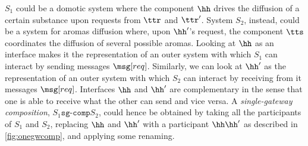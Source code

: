 \noindent
$S_1$ could be a domotic system where the component $\hh$ drives the diffusion of a certain substance
upon requests from $\ttr$ and $\ttr'$.
System $S_2$, instead, could be a system for aromas diffusion where, upon $\hh'$'s request, 
the component $\tts$ coordinates the diffusion of several possible aromas.  
 Looking at $\hh$ as an interface makes it the representation of an outer system with which
 $S_1$ can interact by sending messages $\msg[req]$. Similarly, we can look at $\hh'$ as the
 representation of an outer system with which
 $S_2$ can interact by receiving from it messages $\msg[req]$.
 Interfaces $\hh$ and $\hh'$ are complementary in the sense that one is able to receive what the other can send and vice versa. A {\em single-gateway composition}, $S_1\!\mathtt{sg\text{-}comp}S_2$, could hence be obtained by taking all the participants of $S_1$ and $S_2$, replacing $\hh$ and $\hh'$
with a participant $\hh\hh'$ as described in \cref{fig:onegwcomp}, and applying some renaming.
\begin{figure}[h]
\end{figure}

